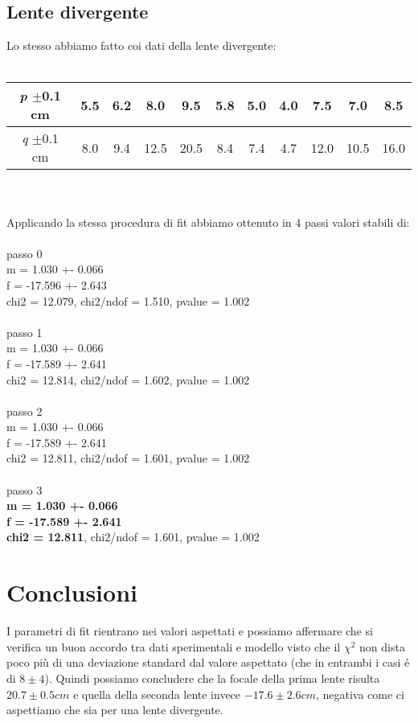 \documentclass{article}
\begin{document}
	\subsection{Lente divergente}
		Lo stesso abbiamo fatto coi dati della lente divergente:\\\\
		\begin{tabular}{ccccccccccc}
			\emph{p} $\pm$0.1 cm& 5.5& 6.2& 8.0& 9.5& 5.8& 5.0& 4.0& 7.5& 7.0& 8.5 \\
			\hline 
			\emph{q} $\pm$0.1 cm& 8.0& 9.4& 12.5& 20.5& 8.4& 7.4& 4.7& 12.0& 10.5& 16.0 
		\end{tabular}\\\\
		Applicando la stessa procedura di fit abbiamo ottenuto in 4 passi valori stabili di:\\\\
		passo 0\\
		m = 1.030 +- 0.066\\
		f = -17.596 +- 2.643\\
		chi2 = 12.079, chi2/ndof = 1.510, pvalue = 1.002\\\\
		passo 1\\
		m = 1.030 +- 0.066\\
		f = -17.589 +- 2.641\\
		chi2 = 12.814, chi2/ndof = 1.602, pvalue = 1.002\\\\
		passo 2\\
		m = 1.030 +- 0.066\\
		f = -17.589 +- 2.641\\
		chi2 = 12.811, chi2/ndof = 1.601, pvalue = 1.002\\\\
		passo 3\\
		\textbf{m = 1.030 +- 0.066}\\
		\textbf{f = -17.589 +- 2.641}\\
		\textbf{chi2 = 12.811}, chi2/ndof = 1.601, pvalue = 1.002
	
	\section{Conclusioni}
	I parametri di fit rientrano nei valori aspettati e possiamo affermare che si verifica un buon accordo tra dati sperimentali e modello visto che il $\chi^2$ non dista poco pi\`{u} di una deviazione standard dal valore aspettato (che in entrambi i casi \'{e} di $8 \pm 4$). Quindi possiamo concludere che la focale della prima lente risulta $20.7 \pm 0.5 cm$ e quella della seconda lente invece $-17.6 \pm 2.6 cm$, negativa come ci aspettiamo che sia per una lente divergente.
\end{document}
